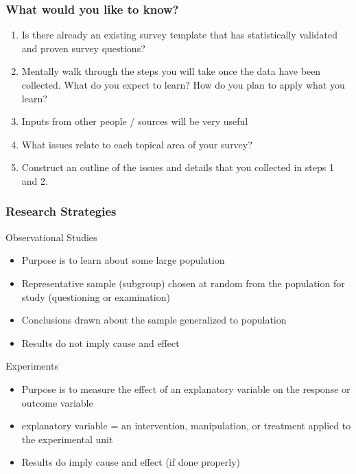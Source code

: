 \documentclass[10pt, compress]{beamer}
\begin{document}
\begin{frame}
    \frametitle{What would you like to know?}
    \begin{enumerate}
        \item Is there already an existing survey template that has statistically validated and proven survey questions?
        \item Mentally walk through the steps you will take once the data have been collected. What do you expect to learn? How do you plan to apply what you learn?
        \item Inputs from other people / sources will be very useful
        \item What issues relate to each topical area of your survey?
        \item Construct an outline of the issues and details that you collected in steps 1 and 2.
    \end{enumerate}
\end{frame}

\begin{frame}
    \frametitle{Research Strategies}
    \begin{block}{Observational Studies}
        \begin{itemize}
            \item Purpose is to learn about some large population
            \item Representative sample (subgroup) chosen at random from the population for study (questioning or examination)
            \item Conclusions drawn about the sample generalized to population
            \item Results do \alert{not} imply cause and effect
        \end{itemize}
    \end{block}
    \begin{block}{Experiments}
        \begin{itemize}
            \item Purpose is to measure the effect of an explanatory variable on the response or outcome variable
            \item explanatory variable = an intervention, manipulation, or treatment applied to the experimental unit
            \item Results do imply cause and effect (if done properly)
        \end{itemize}
    \end{block}
\end{frame}
\end{document}
